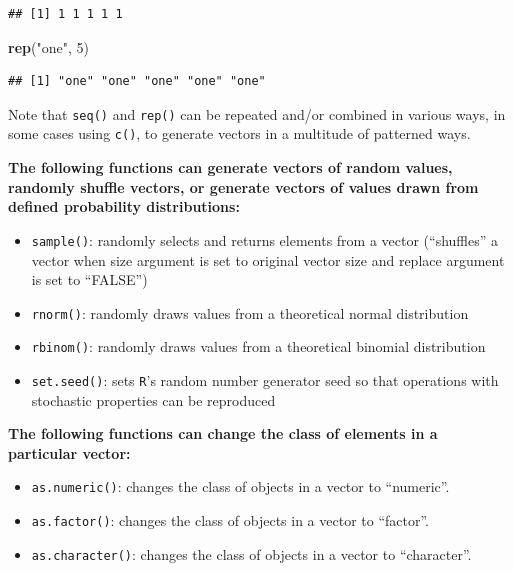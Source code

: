 \documentclass[]{book}
\newenvironment{Shaded}{\begin{snugshade}}{\end{snugshade}}
\newcommand{\DecValTok}[1]{\textcolor[rgb]{0.00,0.00,0.81}{#1}}
\newcommand{\KeywordTok}[1]{\textcolor[rgb]{0.13,0.29,0.53}{\textbf{#1}}}
\newcommand{\NormalTok}[1]{#1}
\newcommand{\StringTok}[1]{\textcolor[rgb]{0.31,0.60,0.02}{#1}}
\begin{document}
\begin{verbatim}
## [1] 1 1 1 1 1
\end{verbatim}

\begin{Shaded}
\begin{Highlighting}[]
\KeywordTok{rep}\NormalTok{(}\StringTok{"one"}\NormalTok{, }\DecValTok{5}\NormalTok{)}
\end{Highlighting}
\end{Shaded}

\begin{verbatim}
## [1] "one" "one" "one" "one" "one"
\end{verbatim}

Note that \texttt{seq()} and \texttt{rep()} can be repeated and/or combined in various ways, in some cases using \texttt{c()}, to generate vectors in a multitude of patterned ways.

\textbf{The following functions can generate vectors of random values, randomly shuffle vectors, or generate vectors of values drawn from defined probability distributions:}

\begin{itemize}
\item
  \texttt{sample()}: randomly selects and returns elements from a vector (``shuffles'' a vector when size argument is set to original vector size and replace argument is set to ``FALSE'')
\item
  \texttt{rnorm()}: randomly draws values from a theoretical normal distribution
\item
  \texttt{rbinom()}: randomly draws values from a theoretical binomial distribution
\item
  \texttt{set.seed()}: sets \texttt{R}'s random number generator seed so that operations with stochastic properties can be reproduced
\end{itemize}

\textbf{The following functions can change the class of elements in a particular vector:}

\begin{itemize}
\item
  \texttt{as.numeric()}: changes the class of objects in a vector to ``numeric''.
\item
  \texttt{as.factor()}: changes the class of objects in a vector to ``factor''.
\item
  \texttt{as.character()}: changes the class of objects in a vector to ``character''.
\end{itemize}
\end{document}
